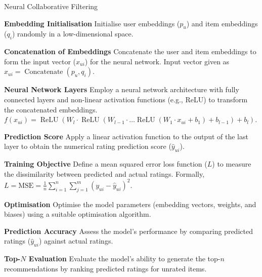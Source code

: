 \begin{algorithm}
    \caption{Neural Collaborative Filtering}
    \begin{algorithmic}[1]
      \State \textbf{Embedding Initialisation}
      \newline \quad Initialise user embeddings ($p_u$) and item embeddings ($q_i$) randomly in a low-dimensional space.
    
      \State \textbf{Concatenation of Embeddings}
      \newline \quad Concatenate the user and item embeddings to form the input vector ($x_{u i}$) for the neural network. Input vector given as $x_{u i} = \operatorname{Concatenate}(p_u, q_i)$.
    
      \State \textbf{Neural Network Layers}
      \newline \quad Employ a neural network architecture with fully connected layers and non-linear activation functions (e.g., ReLU) to transform the concatenated embeddings. 
      \newline \quad $f(x_{u i}) = \operatorname{ReLU}\left(W_l \cdot \operatorname{ReLU}\left(W_{l-1} \cdot \ldots \operatorname{ReLU}\left(W_1 \cdot x_{u i} + b_1\right) + b_{l-1}\right) + b_l\right)$.
    
      \State \textbf{Prediction Score}
      \newline \quad Apply a linear activation function to the output of the last layer to obtain the numerical rating prediction score ($\hat{y}_{u i}$).
    
      \State \textbf{Training Objective}
      \newline \quad Define a mean squared error loss function ($L$) to measure the dissimilarity between predicted and actual ratings. Formally, $L = \text{MSE} = \frac{1}{n} \sum_{i=1}^{n} \sum_{j=1}^{m} (y_{ui} - \hat{y}_{ui})^2$.
    
      \State \textbf{Optimisation}
      \newline \quad Optimise the model parameters (embedding vectors, weights, and biases) using a suitable optimisation algorithm.
    
      \State \textbf{Prediction Accuracy}
      \newline \quad Assess the model's performance by comparing predicted ratings ($\hat{y}_{u i}$) against actual ratings.
    
      \State \textbf{Top-$N$ Evaluation}
      \newline \quad Evaluate the model's ability to generate the top-$n$ recommendations by ranking predicted ratings for unrated items.
    \end{algorithmic}
    \end{algorithm}
    
